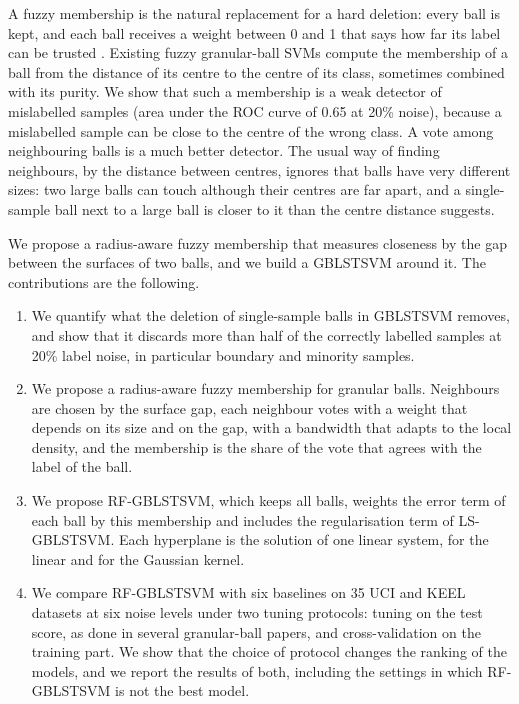 \documentclass[preprint,12pt]{elsarticle}
\newcommand{\RF}{RF-GBLSTSVM}
\begin{document}
A fuzzy membership is the natural replacement for a hard deletion: every ball is kept, and each ball receives a weight between 0 and 1 that says how far its label can be trusted \cite{lin2002}. Existing fuzzy granular-ball SVMs \cite{xia2024gbfsvm,lang2025gbftsvm,liu2026rgbiftsvm} compute the membership of a ball from the distance of its centre to the centre of its class, sometimes combined with its purity. We show that such a membership is a weak detector of mislabelled samples (area under the ROC curve of 0.65 at 20\% noise), because a mislabelled sample can be close to the centre of the wrong class. A vote among neighbouring balls is a much better detector. The usual way of finding neighbours, by the distance between centres, ignores that balls have very different sizes: two large balls can touch although their centres are far apart, and a single-sample ball next to a large ball is closer to it than the centre distance suggests.

We propose a radius-aware fuzzy membership that measures closeness by the gap between the surfaces of two balls, and we build a GBLSTSVM around it. The contributions are the following.
\begin{enumerate}
\item We quantify what the deletion of single-sample balls in GBLSTSVM removes, and show that it discards more than half of the correctly labelled samples at 20\% label noise, in particular boundary and minority samples.
\item We propose a radius-aware fuzzy membership for granular balls. Neighbours are chosen by the surface gap, each neighbour votes with a weight that depends on its size and on the gap, with a bandwidth that adapts to the local density, and the membership is the share of the vote that agrees with the label of the ball.
\item We propose \RF{}, which keeps all balls, weights the error term of each ball by this membership and includes the regularisation term of LS-GBLSTSVM. Each hyperplane is the solution of one linear system, for the linear and for the Gaussian kernel.
\item We compare \RF{} with six baselines on 35 UCI and KEEL datasets at six noise levels under two tuning protocols: tuning on the test score, as done in several granular-ball papers, and cross-validation on the training part. We show that the choice of protocol changes the ranking of the models, and we report the results of both, including the settings in which \RF{} is not the best model.
\end{enumerate}
\end{document}
